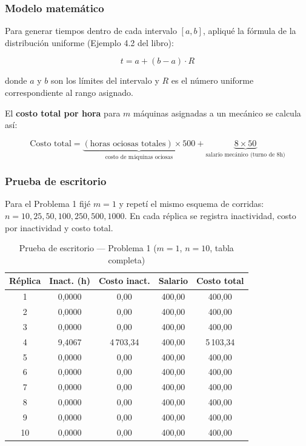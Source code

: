 \documentclass[12pt,a4paper]{article}
\begin{document}
\subsubsection{Modelo matemático}

Para generar tiempos dentro de cada intervalo $[a, b]$, apliqué la fórmula de la distribución uniforme (Ejemplo 4.2 del libro):

\begin{formulabox}
\[
t = a + (b - a) \cdot R
\]

donde $a$ y $b$ son los límites del intervalo y $R$ es el número uniforme correspondiente al rango asignado.
\end{formulabox}

El \textbf{costo total por hora} para $m$ máquinas asignadas a un mecánico se calcula así:

\[
\text{Costo total} = \underbrace{(\text{horas ociosas totales}) \times 500}_{\text{costo de máquinas ociosas}} + \underbrace{8 \times 50}_{\text{salario mecánico (turno de 8h)}}
\]

\subsubsection{Prueba de escritorio}

Para el Problema 1 fijé $m=1$ y repetí el mismo esquema de corridas: $n=10,25,50,100,250,500,1000$. En cada réplica se registra inactividad, costo por inactividad y costo total.

\begin{table}[H]
\centering
\caption{Prueba de escritorio — Problema 1 ($m=1$, $n=10$, tabla completa)}
\begin{tabular}{ccccc}
\toprule
\textbf{Réplica} & \textbf{Inact. (h)} & \textbf{Costo inact.} & \textbf{Salario} & \textbf{Costo total} \\
\midrule
1 & 0,0000 & 0,00 & 400,00 & 400,00 \\
2 & 0,0000 & 0,00 & 400,00 & 400,00 \\
3 & 0,0000 & 0,00 & 400,00 & 400,00 \\
4 & 9,4067 & 4\,703,34 & 400,00 & 5\,103,34 \\
5 & 0,0000 & 0,00 & 400,00 & 400,00 \\
6 & 0,0000 & 0,00 & 400,00 & 400,00 \\
7 & 0,0000 & 0,00 & 400,00 & 400,00 \\
8 & 0,0000 & 0,00 & 400,00 & 400,00 \\
9 & 0,0000 & 0,00 & 400,00 & 400,00 \\
10 & 0,0000 & 0,00 & 400,00 & 400,00 \\
\bottomrule
\end{tabular}
\end{table}
\end{document}
